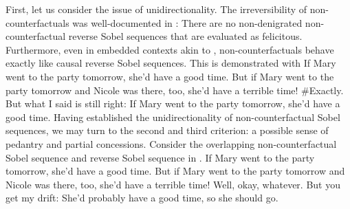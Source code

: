 First, let us consider the issue of unidirectionality. The irreversibility of non-counterfactuals was well-documented in : There are no non-denigrated non-counterfactual reverse Sobel sequences that are evaluated as felicitous. Furthermore, even in embedded contexts akin to , non-counterfactuals behave exactly like causal reverse Sobel sequences. This is demonstrated with 
\pex{}%
			\a	{}If Mary went to the party tomorrow, she'd have a good time.
			\a	{}But if Mary went to the party tomorrow and Nicole was there, too, she'd have a terrible time!
			\a	{}\#Exactly. But what I said is still right: If Mary went to the party tomorrow, she'd have a good time.
\xe
Having established the unidirectionality of non-counterfactual Sobel sequences, we may turn to the second and third criterion: a possible sense of pedantry and partial concessions. Consider the overlapping non-counterfactual Sobel sequence and reverse Sobel sequence in .
\pex{}%
			\a	{}If Mary went to the party tomorrow, she'd have a good time.
			\a	{}But if Mary went to the party tomorrow and Nicole was there, too, she'd have a terrible time!
			\a	{}Well, okay, whatever. But you get my drift: She'd probably have a good time, so she should go.
\xe

